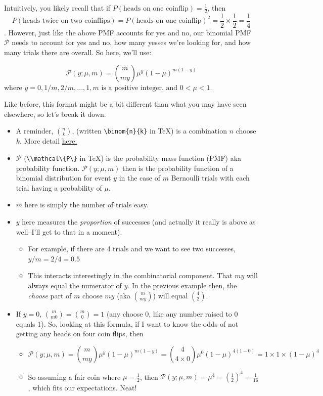 \documentclass[
]{book}
\providecommand{\tightlist}{%
  \setlength{\itemsep}{0pt}\setlength{\parskip}{0pt}}
\begin{document}
Intuitively, you likely recall that if \(P(\textrm{heads on one coinflip})=\frac{1}{2}\), then \[P(\textrm{heads twice on two coinflips})=P(\textrm{heads on one coinflip})^2=\frac{1}{2}\times\frac{1}{2}=\frac{1}{4}\]. However, just like the above PMF accounts for yes and no, our binomial PMF \(\mathcal{P}\) needs to account for yes and no, how many yesses we're looking for, and how many trials there are overall. So here, we'll use:

\[\mathcal{P}(y;\mu,m)=\binom{m}{my}\mu^y(1-\mu)^{m(1-y)}\]
where \(y={0, 1/m, 2/m, ..., 1}, m \textrm{ is a positive integer, and }0<\mu<1.\)

Like before, this format might be a bit different than what you may have seen elsewhere, so let's break it down.

\begin{itemize}
\tightlist
\item
  A reminder, \(\binom{n}{k}\), (written \texttt{\textbackslash{}binom\{n\}\{k\}} in TeX) is a combination \(n\) choose \(k\). More detail \href{https://en.wikipedia.org/wiki/Combination}{here.}
\item
  \(\mathcal{P}\) (\texttt{\textbackslash{}\textbackslash{}mathcal\textbackslash{}\{P\textbackslash{}\}} in TeX) is the probability mass function (PMF) aka probability function. \(\mathcal{P}(y;\mu,m)\) then is the probability function of a binomial distribution for event \(y\) in the case of \(m\) Bernoulli trials with each trial having a probability of \(\mu\).
\item
  \(m\) here is simply the number of trials easy.
\item
  \(y\) here measures the \emph{proportion} of successes (and actually it really is above as well--I'll get to that in a moment).

  \begin{itemize}
  \tightlist
  \item
    For example, if there are 4 trials and we want to see two successes, \(y/m=2/4=0.5\)
  \item
    This interacts interestingly in the combinatorial component. That \(my\) will always equal the numerator of \(y\). In the previous example then, the \emph{choose} part of \(m\) choose \(my\) (aka \(\binom{m}{my}\)) will equal \(\binom{4}{2}\).
  \end{itemize}
\item
  If \(y=0\), \(\binom{m}{m0}=\binom{m}{0}=1\) (any choose 0, like any number raised to 0 equals 1). So, looking at this formula, if I want to know the odds of not getting any heads on four coin flips, then

  \begin{itemize}
  \tightlist
  \item
    \[\mathcal{P}(y;\mu,m)=\binom{m}{my}\mu^y(1-\mu)^{m(1-y)}=\binom{4}{4\times0}\mu^0(1-\mu)^{4(1-0)}=1\times1\times(1-\mu)^4\]
  \item
    So assuming a fair coin where \(\mu=\frac{1}{2}\), then \(\mathcal{P}(y;\mu,m)=\mu^4=(\frac{1}{2})^4=\frac{1}{16}\), which fits our expectations. Neat!
  \end{itemize}
\end{itemize}
\end{document}

